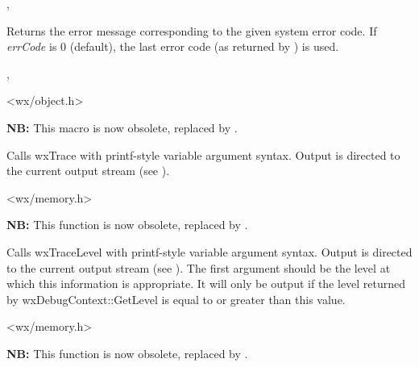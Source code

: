 
,

\label{wxsyserrormsg}


Returns the error message corresponding to the given system error code. If
{\it errCode} is $0$ (default), the last error code (as returned by
) is used.


,

\label{trace}


<wx/object.h>


{\bf NB:} This macro is now obsolete, replaced by .

Calls wxTrace with printf-style variable argument syntax. Output
is directed to the current output stream (see ).


<wx/memory.h>

\label{tracelevel}


{\bf NB:} This function is now obsolete, replaced by .

Calls wxTraceLevel with printf-style variable argument syntax. Output
is directed to the current output stream (see ).
The first argument should be the level at which this information is appropriate.
It will only be output if the level returned by wxDebugContext::GetLevel is equal to or greater than
this value.


<wx/memory.h>

\label{wxtrace}


{\bf NB:} This function is now obsolete, replaced by .

